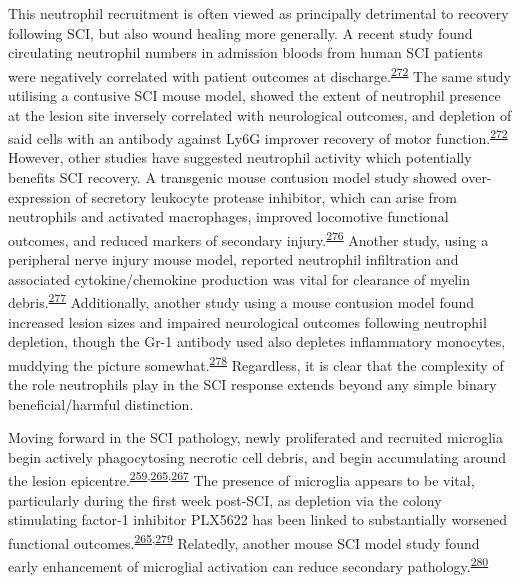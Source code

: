 \documentclass[
]{article}
\begin{document}
This neutrophil recruitment is often viewed as principally detrimental to recovery following SCI, but also wound healing more generally.
A recent study found circulating neutrophil numbers in admission bloods from human SCI patients were negatively correlated with patient outcomes at discharge.\textsuperscript{\protect\hyperlink{ref-brennan_complement_2019}{272}}
The same study utilising a contusive SCI mouse model, showed the extent of neutrophil presence at the lesion site inversely correlated with neurological outcomes, and depletion of said cells with an antibody against Ly6G improver recovery of motor function.\textsuperscript{\protect\hyperlink{ref-brennan_complement_2019}{272}}
However, other studies have suggested neutrophil activity which potentially benefits SCI recovery.
A transgenic mouse contusion model study showed over-expression of secretory leukocyte protease inhibitor, which can arise from neutrophils and activated macrophages, improved locomotive functional outcomes, and reduced markers of secondary injury.\textsuperscript{\protect\hyperlink{ref-ghasemlou_beneficial_2010}{276}}
Another study, using a peripheral nerve injury mouse model, reported neutrophil infiltration and associated cytokine/chemokine production was vital for clearance of myelin debris.\textsuperscript{\protect\hyperlink{ref-lindborg_neutrophils_2017}{277}}
Additionally, another study using a mouse contusion model found increased lesion sizes and impaired neurological outcomes following neutrophil depletion, though the Gr-1 antibody used also depletes inflammatory monocytes, muddying the picture somewhat.\textsuperscript{\protect\hyperlink{ref-stirling_depletion_2009}{278}}
Regardless, it is clear that the complexity of the role neutrophils play in the SCI response extends beyond any simple binary beneficial/harmful distinction.

Moving forward in the SCI pathology, newly proliferated and recruited microglia begin actively phagocytosing necrotic cell debris, and begin accumulating around the lesion epicentre.\textsuperscript{\protect\hyperlink{ref-pineau_proinflammatory_2007}{259},\protect\hyperlink{ref-bellver-landete_microglia_2019}{265},\protect\hyperlink{ref-greenhalgh_differences_2014}{267}}
The presence of microglia appears to be vital, particularly during the first week post-SCI, as depletion via the colony stimulating factor-1 inhibitor PLX5622 has been linked to substantially worsened functional outcomes.\textsuperscript{\protect\hyperlink{ref-bellver-landete_microglia_2019}{265},\protect\hyperlink{ref-brennan_microglia_2018}{279}}
Relatedly, another mouse SCI model study found early enhancement of microglial activation can reduce secondary pathology.\textsuperscript{\protect\hyperlink{ref-stirling_toll-like_2014}{280}}
\end{document}
